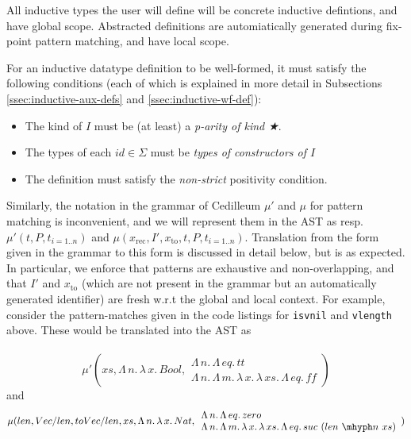 \documentclass{article}
\newcommand{\absu}[3]{{#1}\, #2.\, #3}
\begin{document}
\noindent All inductive types the user will define will be concrete inductive
defintions, and have global scope. Abstracted definitions are automiatically
generated during fix-point pattern matching, and have local scope.

For an inductive datatype definition to be well-formed, it must satisfy the
following conditions (each of which is explained in more detail in Subsections
\ref{ssec:inductive-aux-defs} and \ref{ssec:inductive-wf-def}):

\begin{itemize}
\item The kind of $I$ must be (at least) a \textit{p-arity of kind ★}.
\item The types of each $id \in \Sigma$ must be \textit{types of constructors
    of $I$}
\item The definition must satisfy the \textit{non-strict} positivity condition.
\end{itemize}

Similarly, the notation in the grammar of Cedilleum $\mu'$ and $\mu$ for pattern
matching is inconvenient, and we will represent them in the AST as resp.
$\mu'(t,P,t_{i=1..n})$ and
$\mu(x_{\text{rec}},I',x_{\text{to}},t,P,t_{i=1..n})$. Translation from the form
given in the grammar to this form is discussed in detail below, but is as
expected. In particular, we enforce that patterns are exhaustive and
non-overlapping, and that $I'$ and $x_{\text{to}}$ (which are not present in the grammar
but an automatically generated identifier) are fresh w.r.t the global and local
context. For example, consider the pattern-matches given in the code listings
for \texttt{isvnil} and \texttt{vlength} above. These would be translated into
the AST as
\\ \\
\[
  \mu'(xs,\absu{\Lambda}{n}{\absu{\lambda}{x}{Bool}},
  \begin{array}{l}
    \absu{\Lambda}{n}{\absu{\Lambda}{eq}{tt}}
    \\ \absu{\Lambda}{n}{\absu{\Lambda}{m}{\absu{\lambda}{x}{\absu{\lambda}{xs}{\absu{\Lambda}{eq}{ff}}}}}
  \end{array}
  )
\] and
\[ \mu(len, Vec/len, toVec/len,xs,\absu{\Lambda}{n}{\absu{\lambda}{x}{Nat}},
  \begin{array}{l}
    \absu{\Lambda}{n}{\absu{\Lambda}{eq}{zero}}
    \\ \absu{\Lambda}{n}{\absu{\Lambda}{m}{\absu{\lambda}{x}{\absu{\lambda}{xs}{\absu{\Lambda}{eq}{suc\
    (len\ \mhyph n\ xs)}}}}}
  \end{array})
\]
\end{document}
